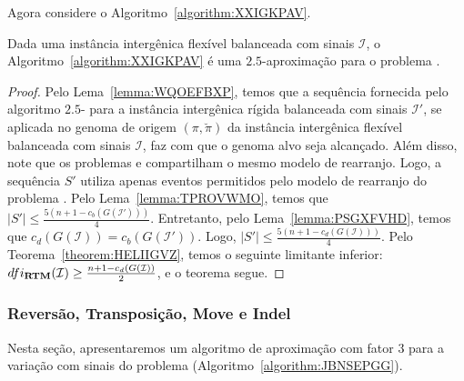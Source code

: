Agora considere o Algoritmo~\ref{algorithm:XXIGKPAV}.



\begin{theorem}\label{theorem:BZSXXPYW}
Dada uma instância intergênica flexível balanceada com sinais $\mathcal{I}$, o Algoritmo~\ref{algorithm:XXIGKPAV} é uma $2.5$-aproximação para o problema \SbFIRTM{}.
\end{theorem}
\begin{proof}
Pelo Lema~\ref{lemma:WQOEFBXP}, temos que a sequência fornecida pelo algoritmo $2.5$-\SbIRT{} para a instância intergênica rígida balanceada com sinais $\mathcal{I'}$, se aplicada no genoma de origem $(\pi,\breve\pi)$ da instância intergênica flexível balanceada com sinais $\mathcal{I}$, faz com que o genoma alvo seja alcançado. Além disso, note que os problemas \SbIRTM{} e \SbFIRTM{} compartilham o mesmo modelo de rearranjo. Logo, a sequência $S'$ utiliza apenas eventos permitidos pelo modelo de rearranjo do problema \SbFIRTM{}. Pelo Lema~\ref{lemma:TPROVWMO}, temos que $|S'| \le \frac{5({n+1} - c_b(G(\mathcal{I}')))}{4}$. Entretanto, pelo Lema~\ref{lemma:PSGXFVHD}, temos que $c_d(G(\mathcal{I})) = c_b(G(\mathcal{I}'))$. Logo, $|S'| \le \frac{5({n+1} - c_d(G(\mathcal{I})))}{4}$. Pelo Teorema~\ref{theorem:HELIIGVZ}, temos o seguinte limitante inferior: $dfi_{\textbf{RTM}}(\mathcal{I}) \ge \frac{{n+1} - c_d(G(\mathcal{I}))}{2}$, e o teorema segue.
\end{proof}

\subsubsection{Reversão, Transposição, Move e Indel}

Nesta seção, apresentaremos um algoritmo de aproximação com fator $3$ para a variação com sinais do problema \SbFIRTMI{} (Algoritmo~\ref{algorithm:JBNSEPGG}).



